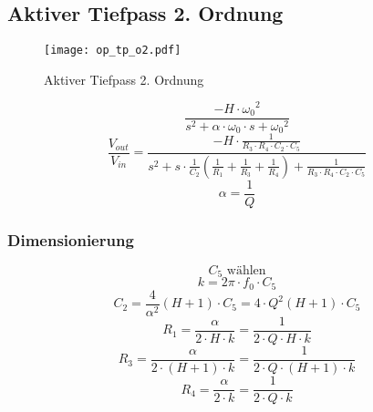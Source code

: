



\subsection{Aktiver Tiefpass 2. Ordnung}
\begin{figure}[h!]
	\centering
	\texttt{[image: op\_tp\_o2.pdf]}
	\caption{Aktiver Tiefpass 2. Ordnung}
	\label{sch:op-tp-o2}
\end{figure}
\[ \frac{-H \cdot {\omega_0}^2}
{s^2 + \alpha \cdot \omega_0 \cdot s + {\omega_0}^2} \]
\[ \frac{V_{out}}{V_{in}} 
= \frac{-H \cdot \frac{1}{R_3 \cdot R_4 \cdot C_2 \cdot C_5}}
{s^2 + s \cdot \frac{1}{C_2} 
\left(\frac{1}{R_1} + \frac{1}{R_3} + \frac{1}{R_4}\right) 
+ \frac{1}{R_3 \cdot R_4 \cdot C_2 \cdot C_5}} \]
\[ \alpha = \frac{1}{Q} \]

\subsubsection{Dimensionierung}
\[ C_5 \text{ wählen} \]
\[ k = 2 \pi \cdot f_0 \cdot C_5 \]
\[ C_2 = \frac{4}{\alpha^2} (H + 1) \cdot C_5 
= 4 \cdot Q^2 (H + 1) \cdot C_5 \]
\[ R_1 = \frac{\alpha}{2 \cdot H \cdot k} 
= \frac{1}{2 \cdot Q \cdot H \cdot k} \]
\[ R_3 = \frac{\alpha}{2 \cdot (H + 1) \cdot k} 
= \frac{1}{2 \cdot Q \cdot (H + 1) \cdot k} \]
\[ R_4 = \frac{\alpha}{2 \cdot k} = \frac{1}{2 \cdot Q \cdot k} \]
